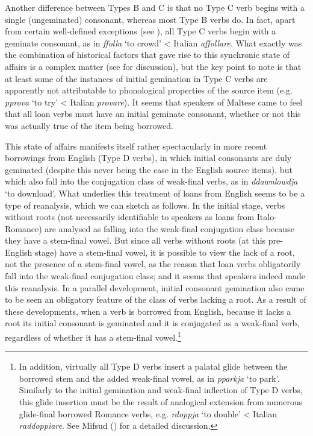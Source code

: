 \documentclass[output=paper]{langsci/langscibook}
\begin{document}
Another difference between Types B and C is that no Type C verb begins with a single (ungeminated) consonant, whereas most Type B verbs do. In fact, apart from certain well-defined exceptions (see \citealt[152]{mifsudloanverbs}), all Type C verbs begin with a geminate consonant, as in \textit{ffolla} `to crowd' < Italian \textit{affollare}. What exactly was the combination of historical factors that gave rise to this synchronic state of affairs is a complex matter (see \citealt[158--168]{mifsudloanverbs} for discussion), but the key point to note is that at least some of the instances of initial gemination in Type C verbs are apparently not attributable to phonological properties of the source item (e.g. \textit{pprova} `to try' < Italian \textit{provare}). It seems that speakers of Maltese came to feel that all loan verbs must have an initial geminate consonant, whether or not this was actually true of the item being borrowed.

This state of affairs manifests itself rather spectacularly in more recent borrowings from English (Type D verbs), in which initial consonants are duly geminated (despite this never being the case in the English source items), but which also fall into the conjugation class of weak-final verbs, as in \textit{ddawnlowdja} `to download'. What underlies this treatment of loans from English seems to be a type of reanalysis, which we can sketch as follows. In the initial stage, verbs without roots (not necessarily identifiable to speakers as loans from Italo-Romance) are analysed as falling into the weak-final conjugation class because they have a stem-final vowel. But since all verbs without roots (at this pre-English stage) have a stem-final vowel, it is possible to view the lack of a root, not the presence of a stem-final vowel, as the reason that loan verbs obligatorily fall into the weak-final conjugation class; and it seems that speakers indeed made this reanalysis. In a parallel development, initial consonant gemination also came to be seen an obligatory feature of the class of verbs lacking a root. As a result of these developments, when a verb is borrowed from English, because it lacks a root its initial consonant is geminated and it is conjugated as a weak-final verb, regardless of whether it has a stem-final vowel.\footnote{In addition, virtually all Type D verbs insert a palatal glide between the borrowed stem and the added weak-final vowel, as in \textit{pparkja} `to park'. Similarly to the initial gemination and weak-final inflection of Type D verbs, this glide insertion must be the result of analogical extension from numerous glide-final borrowed Romance verbs, e.g. \textit{rdoppja} `to double' < Italian \textit{raddoppiare}. See Mifsud (\citeyear[225--236]{mifsudloanverbs}) for a detailed discussion.}
\end{document}
